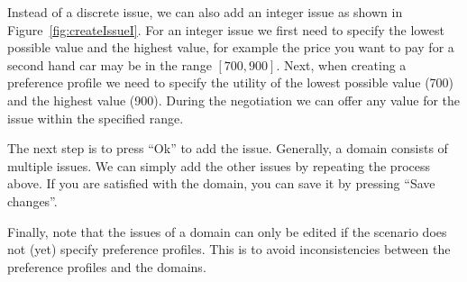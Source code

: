 \documentclass[]{article}
\begin{document}
Instead of a discrete issue, we can also add an integer issue as shown in Figure~\ref{fig:createIssueI}. For an integer issue we first need to specify the lowest possible value and the highest value, for example the price you want to pay for a second hand car may be in the range $[700, 900]$. Next, when creating a preference profile we need to specify the utility of the lowest possible value (700) and the highest value (900). During the negotiation we can offer any value for the issue within the specified range.

The next step is to press ``Ok'' to add the issue. Generally, a domain consists of multiple issues. We can simply add the other issues by repeating the process above. If you are satisfied with the domain, you can save it by pressing  ``Save changes''.

Finally, note that the issues of a domain can only be edited if the scenario does not (yet) specify preference profiles. This is to avoid inconsistencies between the preference profiles and the domains. 
\end{document}
